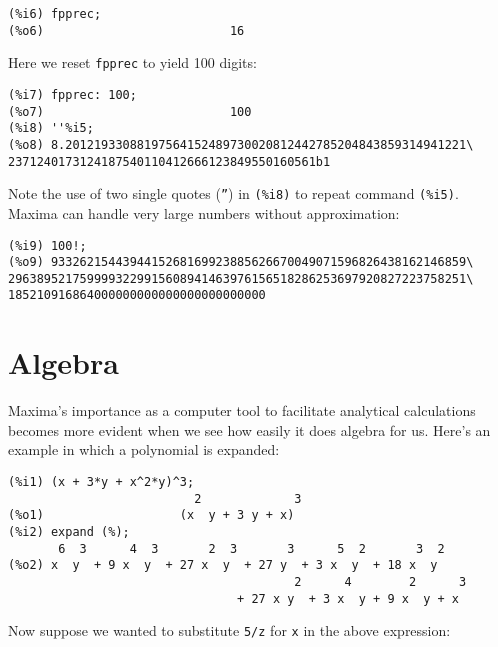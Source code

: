 \documentclass[a4paper,12pt]{article}
\begin{document}
\begin{verbatim}
(%i6) fpprec;
(%o6)                          16
\end{verbatim}
Here we reset {\tt fpprec} to yield 100 digits:
\begin{verbatim}
(%i7) fpprec: 100;
(%o7)                          100
(%i8) ''%i5;
(%o8) 8.20121933088197564152489730020812442785204843859314941221\
2371240173124187540110412666123849550160561b1
\end{verbatim}
Note the use of two single quotes ({\tt ''}) in {\tt (\%i8)} to repeat
command {\tt (\%i5)}.  Maxima can handle very large numbers without
approximation:
\begin{verbatim}
(%i9) 100!;
(%o9) 9332621544394415268169923885626670049071596826438162146859\
2963895217599993229915608941463976156518286253697920827223758251\
185210916864000000000000000000000000
\end{verbatim}

\section{Algebra \label{sec:algebra}}

Maxima's importance as a computer tool to facilitate analytical
calculations becomes more evident when we see how easily it does
algebra for us.  Here's an example in which a polynomial is expanded:
\begin{verbatim}
(%i1) (x + 3*y + x^2*y)^3;
                          2             3
(%o1)                   (x  y + 3 y + x)
(%i2) expand (%);
       6  3      4  3       2  3       3      5  2       3  2
(%o2) x  y  + 9 x  y  + 27 x  y  + 27 y  + 3 x  y  + 18 x  y
                                        2      4        2      3
                                + 27 x y  + 3 x  y + 9 x  y + x
\end{verbatim}
Now suppose we wanted to substitute {\tt 5/z} for {\tt x} in the above
expression:
\end{document}
